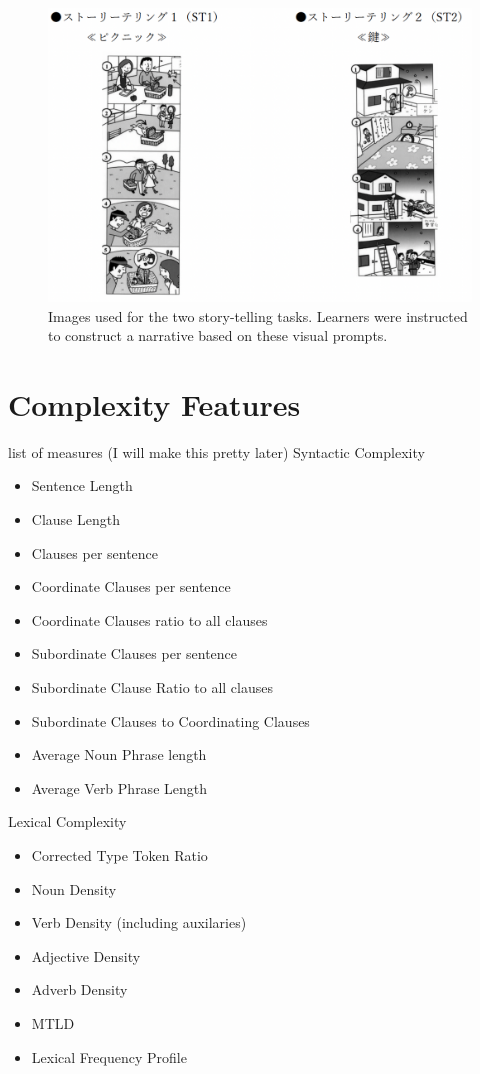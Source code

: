 \begin{figure}[h!]
    \centering
    \includegraphics[scale=.45]{img/ST.png}
    \caption[Story Telling Tasks]{Images used for the two story-telling tasks. Learners were instructed to construct a narrative based on these visual prompts. }
    \label{fig:ST}
\end{figure}


\section{Complexity Features}
list of measures (I will make this pretty later)
Syntactic Complexity
\label{tab:complexity-measures}
\begin{itemize}
    \item Sentence Length
    \item Clause Length
    \item Clauses per sentence
    \item Coordinate Clauses per sentence
    \item Coordinate Clauses ratio to all clauses
    \item Subordinate Clauses per sentence
    \item Subordinate Clause Ratio to all clauses
    \item Subordinate Clauses to Coordinating Clauses
    \item Average Noun Phrase length
    \item Average Verb Phrase Length
\end{itemize}

Lexical Complexity
\begin{itemize}
    \item Corrected Type Token Ratio
    \item Noun Density
    \item Verb Density (including auxilaries)
    \item Adjective Density
    \item Adverb Density
    \item MTLD
    \item Lexical Frequency Profile
\end{itemize}

